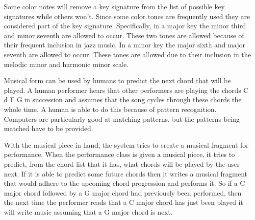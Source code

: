 \documentclass[12pt]{ucthesis}
\begin{document}
Some color notes will remove a key signature from the list of possible key signatures while others won't. Since some color tones are frequently used they are considered part of the key signature.  Specifically, in a major key the minor third and minor seventh are allowed to occur. These two tones are allowed because of their frequent inclusion in jazz music. In a minor key the major sixth and major seventh are allowed to occur. These tones are allowed due to their inclusion in the melodic minor and harmonic minor scale. 

Musical form can be used by humans to predict the next chord that will be played. A human performer hears that other performers are playing the chords C d F G in succession and assumes that the song cycles through these chords the whole time. A human is able to do this because of pattern recognition. Computers are particularly good at matching patterns, but the patterns being matched have to be provided.

With the musical piece in hand, the system tries to create a musical fragment for performance. When the performance class is given a musical piece, it tries to predict, from the chord list that it has, what chords will be played by the user next. If it is able to predict some future chords then it writes a musical fragment that would adhere to the upcoming chord progression and performs it. So if a C major chord followed by a G major chord had previously been performed, then the next time the performer reads that a C major chord has just been played it will write music assuming that a G major chord is next. 
\end{document}
